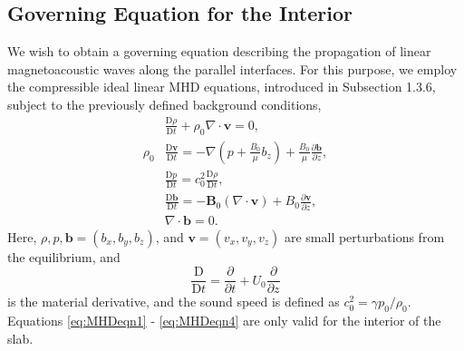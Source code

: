 \subsection{Governing Equation for the Interior}
\label{subsec:goveqint}

We wish to obtain a governing equation describing the propagation of linear magnetoacoustic waves along the parallel interfaces.
For this purpose, we employ the compressible ideal linear MHD equations, introduced in Subsection 1.3.6, subject to the previously defined background conditions,
%
\begin{align}
\label{eq:MHDeqn1}
& \frac{\mathrm{D} \rho}{\mathrm{D} t}
+ \rho_0 \nabla \cdot \mathbf{v}
= 0,
\\[0.3cm]
\label{eq:MHDeqn2}
\rho_0 & \frac{\mathrm{D} \mathbf{v}}{\mathrm{D} t}
= - \nabla ( p + \frac{B_0}{\mu} b_z )
+ \frac{B_0}{\mu} \frac{\partial \mathbf{b}}{\partial z},
\\[0.3cm]
\label{eq:MHDeqn3}
& \frac{\mathrm{D} p}{\mathrm{D} t}
= c_0^2 \frac{\mathrm{D} \rho}{\mathrm{D} t},
\\[0.3cm]
\label{eq:MHDeqn4}
& \frac{\mathrm{D} \mathbf{b}}{\mathrm{D} t}
= - \mathbf{B}_0 ( \nabla \cdot \mathbf{v} )
+ B_0 \frac{\partial \mathbf{v}}{\partial z},
\\[0.2cm]
\nonumber
& \nabla \cdot \mathbf{b} = 0.
\end{align}
%
Here, $\rho, p, \mathbf{b} = (b_x, b_y, b_z)$, and $\mathbf{v} = (v_x, v_y, v_z)$ are small perturbations from the equilibrium, and 
\[
\frac{\mathrm{D}}{\mathrm{D} t} = \frac{\partial}{\partial t} + U_0 \frac{\partial}{\partial z}
\]
is the material derivative, and the sound speed is defined as $c_0^2 = \gamma p_0/\rho_0$.
Equations \eqref{eq:MHDeqn1} - \eqref{eq:MHDeqn4} are only valid for the interior of the slab.


